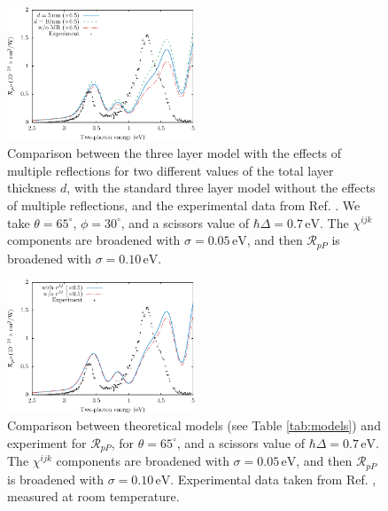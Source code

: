 \begin{figure}[H]
\centering
\includegraphics[width=0.5\textwidth]{content/figures/fig-Si1x1-MRthickness}
\caption{Comparison between the three layer model with the effects of multiple reflections for two different values of the total layer thickness $d$, with the standard three layer model without the effects of multiple reflections, and the experimental data from Ref. \cite{mejiaPRB02}. We take $\theta=65^{\circ}$, $\phi=30^{\circ}$, and a scissors value of $\hbar\Delta = 0.7\,\text{eV}$. The $\chi^{ijk}$ components are broadened with $\sigma=0.05\,\text{eV}$, and then $\mathcal{R}_{pP}$ is broadened with $\sigma=0.10\,\text{eV}$.}
\label{fig:average}
\end{figure}

\begin{figure}[H]
\centering
\includegraphics[width=0.5\textwidth]{content/figures/fig-Si1x1-MRno1w}
\caption{Comparison between theoretical models (see Table
\ref{tab:models}) and experiment for $\mathcal{R}_{pP}$, for
$\theta=65^{\circ}$, and a scissors value of $\hbar\Delta = 0.7\,\text{eV}$. The
$\chi^{ijk}$ components are broadened with $\sigma=0.05\,\text{eV}$, and then
$\mathcal{R}_{pP}$ is broadened with $\sigma=0.10\,\text{eV}$. Experimental data
taken from Ref. \cite{mitchellSS01}, measured at room temperature.}
\label{fig:mr2}
\end{figure}

